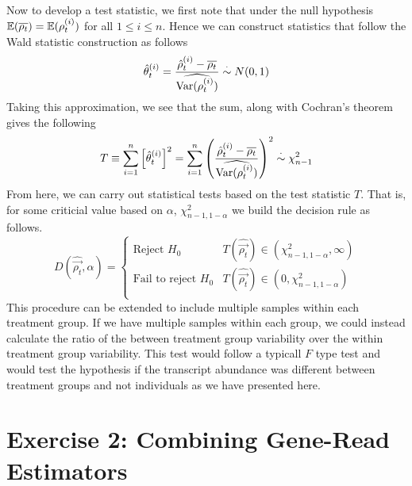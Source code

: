 \documentclass[11pt]{article}
\begin{document}
Now to develop a test statistic, we first note that under the null hypothesis ${\mathbb{E}}(\overline{\rho_t}) = {\mathbb{E}}(\rho_t^{(i)})$ for all $1\leq i \leq n$. Hence we can construct statistics that follow the Wald statistic construction as follows 
\begin{equation}
\hat{\theta}_{t}^{(i)} = \frac{\hat{\rho}_t^{(i)} - \overline{\rho_t}}{\widehat{{\text{Var}}(\rho_t^{(i)})}}\overset{\cdot}{\sim}N(0,1)
\end{equation}
Taking this approximation, we see that the sum, along with Cochran's theorem gives the following 
\begin{equation}
	T\equiv \sum_{i=1}^n\left[\hat{\theta}_t^{(i)}\right]^2 = \sum_{i = 1}^n \left(\frac{\hat{\rho}_t^{(i)} - \overline{\rho_t}}{\widehat{{\text{Var}}(\rho_t^{(i)})}}\right)^2\overset{\cdot}{\sim} \chi^2_{n-1}
\end{equation}
From here, we can carry out statistical tests based on the test statistic $T$. That is, for some criticial value based on $\alpha$, $\chi^2_{n-1, 1-\alpha}$ we build the decision rule as follows. 
\begin{equation}
	D(\hat{\vec{\rho_t}},\alpha) = \begin{cases}
	\text{Reject $H_0$} & T(\hat{\vec{\rho_t}})\in (\chi^2_{n-1, 1 -\alpha}, \infty)\\
	\text{Fail to reject $H_0$} & T(\hat{\vec{\rho_t}})\in (0,\chi^2_{n-1, 1 -\alpha})\\
	\end{cases}
\end{equation}
This procedure can be extended to include multiple samples within each treatment group. If we have multiple samples within each group, we could instead calculate the ratio of the between treatment group variability over the within treatment group variability. This test would follow a typicall $F$ type test and would test the hypothesis if the transcript abundance was different between treatment groups and not individuals as we have presented here.

\section{Exercise 2: Combining Gene-Read Estimators}
\end{document}
